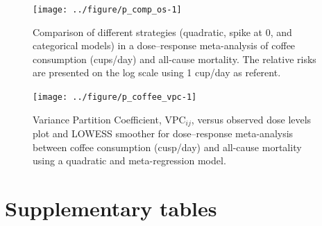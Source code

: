 \documentclass[11pt,a4paper,twoside,openany]{book}\usepackage{knitr}
\begin{document}
{{\begin{knitrout}\footnotesize
{}\color{fgcolor}\begin{figure}[ht!]

{\centering \texttt{[image: ../figure/p\_comp\_os-1]} 

}

\caption[Comparison of different strategies (quadratic, spike at 0, and categorical models) in a dose--response meta-analysis of coffee consumption (cups/day) and all-cause mortality]{Comparison of different strategies (quadratic, spike at 0, and categorical models) in a dose--response meta-analysis of coffee consumption (cups/day) and all-cause mortality. The relative risks are presented on the log scale using 1 cup/day as referent.}\label{fig:p_comp_os}
\end{figure}


\end{knitrout}

\begin{knitrout}\footnotesize
{}\color{fgcolor}\begin{figure}[ht!]

{\centering \texttt{[image: ../figure/p\_coffee\_vpc-1]} 

}

\caption[Variance Partition Coefficient, $\textrm{VPC}_{ij}$, versus observed dose levels plot and LOWESS smoother for dose--response meta-analysis between coffee consumption (cusp/day) and all-cause mortality using a quadratic and meta-regression model]{Variance Partition Coefficient, $\textrm{VPC}_{ij}$, versus observed dose levels plot and LOWESS smoother for dose--response meta-analysis between coffee consumption (cusp/day) and all-cause mortality using a quadratic and meta-regression model.}\label{fig:p_coffee_vpc}
\end{figure}


\end{knitrout}



\chapter{Supplementary tables}

\begin{knitrout}\footnotesize
{}\color{fgcolor}\begin{table}[!h]


\end{table}
\end{knitrout}}}
\end{document}
